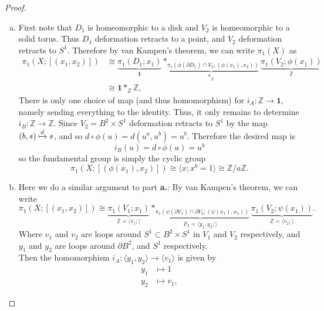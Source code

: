 \documentclass{article}
\begin{document}
\begin{proof} \text{} \\
  \begin{enumerate}[a.]
    \item
    First note that $D_1$ is homeomorphic to a disk and $V_2$ is homeomorphic to
    a solid torus. Thus $D_1$ deformation retracts to a point, and $V_2$
    deformation retracts to $S^1$.
    Therefore by van Kampen's theorem, we can write $\pi_1(X)$ as \begin{align*}
      \pi_1(X; [(x_1, x_2)]) &\cong
      \underbrace{\pi_1(D_1; x_1)}_{\mathbf{1}}
      \underbrace{*_{\pi_1(\phi(\partial D_1) \cap V_2; (\phi(x_1), x_2))}}_{*_\mathbb Z}
      \underbrace{\pi_1(V_2; \phi(x_1))}_{\mathbb Z} \\
      &\cong \mathbf{1} *_\mathbb Z \mathbb Z,
    \end{align*}
    There is only one choice of map (and thus homomorphism) for
    $i_A\colon \mathbb Z \rightarrow \mathbf{1}$, namely sending everything to
    the identity.
    Thus, it only remains to determine
    $i_B\colon \mathbb Z \rightarrow \mathbb Z$. Since $V_2 = B^2 \times S^1$
    deformation retracts to $S^1$ by the map $(b, s) \xmapsto{d} s$, and so
    $d \circ \phi(u) = d(u^a, u^b) = u^b$. Therefore the desired map is \[
      i_B(u) = d \circ \phi(u) = u^b
    \] so the fundamental group is simply the cyclic group \[
      \pi_1(X; [(\phi(x_1), x_2)])
      \cong \langle x; x^b = 1 \rangle
      \cong \mathbb Z/a\mathbb Z.
    \]
    \item Here we do a similar argument to part \textbf{a.}:
      By van Kampen's theorem, we can write \[
        \pi_1(X; [(x_1, x_2)]) \cong
        \underbrace{\pi_1(V_1; x_1)}_{\mathbb Z = \langle v_1; \rangle}
        \underbrace{*_{\pi_1(\psi(\partial V_1) \cap \partial V_2; (\psi(x_1), x_2))}}_{
          F_2 = \langle y_1, y_2; \rangle
        }
        \underbrace{\pi_1(V_2; \psi(x_1))}_{\mathbb Z = \langle v_2; \rangle}.
      \]
      Where $v_1$ and $v_2$ are loops around $S^1 \subset B^2 \times S^1$ in
      $V_1$ and $V_2$ respectively, and $y_1$ and $y_2$ are loops around
      $\partial B^2$, and $S^1$ respectively.
      \\
      Then the homomorphism
      $i_A\colon \langle y_1, y_2 \rangle \rightarrow \langle v_1 \rangle$ is given by
      \begin{align*}
        y_1 &\mapsto 1\\
        y_2 &\mapsto v_1,
      \end{align*}

\end{enumerate}
\end{proof}
\end{document}
